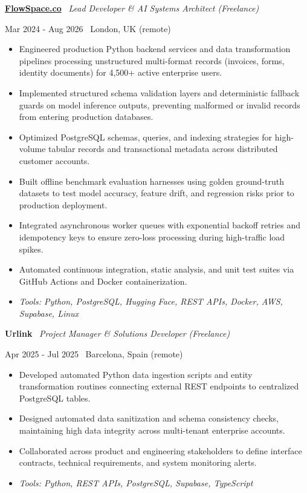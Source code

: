 \documentclass[a4paper,10pt]{article}
\newcommand{\role}[4]{%
 \vspace{2pt}\noindent
 \begin{minipage}[t]{0.70\textwidth}\raggedright\textbf{#1} \textbullet\ \textit{#3}\end{minipage}%
 \hfill
 \begin{minipage}[t]{0.28\textwidth}\raggedleft\footnotesize\color{gray}#2 \textbullet\ #4\end{minipage}%
 \vspace{1pt}%
}
\begin{document}
\role{\href{https://flowspace.co}{FlowSpace.co}}{Mar 2024 - Aug 2026}{Lead Developer \& AI Systems Architect (Freelance)}{London, UK (remote)}
\begin{itemize}
 \item Engineered production Python backend services and data transformation pipelines processing unstructured multi-format records (invoices, forms, identity documents) for 4,500+ active enterprise users.
 \item Implemented structured schema validation layers and deterministic fallback guards on model inference outputs, preventing malformed or invalid records from entering production databases.
 \item Optimized PostgreSQL schemas, queries, and indexing strategies for high-volume tabular records and transactional metadata across distributed customer accounts.
 \item Built offline benchmark evaluation harnesses using golden ground-truth datasets to test model accuracy, feature drift, and regression risks prior to production deployment.
 \item Integrated asynchronous worker queues with exponential backoff retries and idempotency keys to ensure zero-loss processing during high-traffic load spikes.
 \item Automated continuous integration, static analysis, and unit test suites via GitHub Actions and Docker containerization.
 \item \textit{Tools: Python, PostgreSQL, Hugging Face, REST APIs, Docker, AWS, Supabase, Linux}
\end{itemize}

\role{Urlink}{Apr 2025 - Jul 2025}{Project Manager \& Solutions Developer (Freelance)}{Barcelona, Spain (remote)}
\begin{itemize}
 \item Developed automated Python data ingestion scripts and entity transformation routines connecting external REST endpoints to centralized PostgreSQL tables.
 \item Designed automated data sanitization and schema consistency checks, maintaining high data integrity across multi-tenant enterprise accounts.
 \item Collaborated across product and engineering stakeholders to define interface contracts, technical requirements, and system monitoring alerts.
 \item \textit{Tools: Python, REST APIs, PostgreSQL, Supabase, TypeScript}
\end{itemize}
\end{document}
